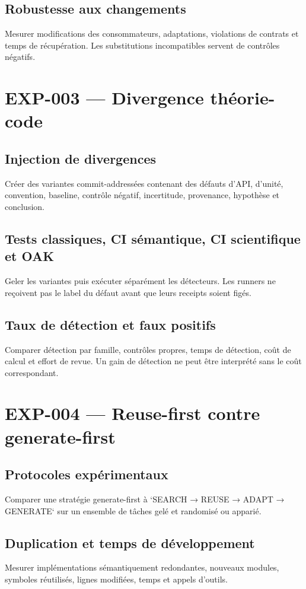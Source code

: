 \section{Robustesse aux changements}
Mesurer modifications des consommateurs, adaptations, violations de contrats et temps de récupération. Les substitutions incompatibles servent de contrôles négatifs.

\chapter{EXP-003 — Divergence théorie-code}
\section{Injection de divergences}
Créer des variantes commit-addressées contenant des défauts d'API, d'unité, convention, baseline, contrôle négatif, incertitude, provenance, hypothèse et conclusion.

\section{Tests classiques, CI sémantique, CI scientifique et OAK}
Geler les variantes puis exécuter séparément les détecteurs. Les runners ne reçoivent pas le label du défaut avant que leurs receipts soient figés.

\section{Taux de détection et faux positifs}
Comparer détection par famille, contrôles propres, temps de détection, coût de calcul et effort de revue. Un gain de détection ne peut être interprété sans le coût correspondant.

\chapter{EXP-004 — Reuse-first contre generate-first}
\section{Protocoles expérimentaux}
Comparer une stratégie generate-first à `SEARCH → REUSE → ADAPT → GENERATE` sur un ensemble de tâches gelé et randomisé ou apparié.

\section{Duplication et temps de développement}
Mesurer implémentations sémantiquement redondantes, nouveaux modules, symboles réutilisés, lignes modifiées, temps et appels d'outils.

